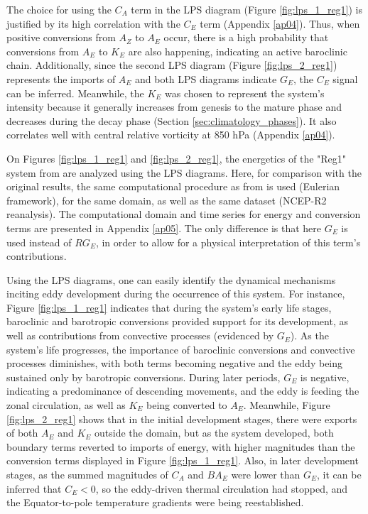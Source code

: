 The choice for using the $C_A$ term in the LPS diagram (Figure \ref{fig:lps_1_reg1}) is justified by its high correlation with the $C_E$ term (Appendix \ref{ap04}). Thus, when positive conversions from $A_Z$ to $A_E$ occur, there is a high probability that conversions from $A_E$ to $K_E$ are also happening, indicating an active baroclinic chain. Additionally, since the second LPS diagram (Figure \ref{fig:lps_2_reg1}) represents the imports of $A_E$ and both LPS diagrams indicate $G_E$, the $C_E$ signal can be inferred. Meanwhile, the $K_E$ was chosen to represent the system's intensity because it generally increases from genesis to the mature phase and decreases during the decay phase (Section \ref{sec:climatology_phases}). It also correlates well with central relative vorticity at 850 hPa (Appendix \ref{ap04}).

On Figures \ref{fig:lps_1_reg1} and \ref{fig:lps_2_reg1}, the energetics of the "Reg1" system from \citet{dias2011energy} are analyzed using the LPS diagrams. Here, for comparison with the original results, the same computational procedure as from \citet{dias2011energy} is used (Eulerian framework), for the same domain, as well as the same dataset (NCEP-R2 reanalysis). The computational domain and time series for energy and conversion terms are presented in Appendix \ref{ap05}. The only difference is that here $G_E$ is used instead of $RG_E$, in order to allow for a physical interpretation of this term's contributions.

Using the LPS diagrams, one can easily identify the dynamical mechanisms inciting eddy development during the occurrence of this system. For instance, Figure \ref{fig:lps_1_reg1} indicates that during the system's early life stages, baroclinic and barotropic conversions provided support for its development, as well as contributions from convective processes (evidenced by $G_E$). As the system's life progresses, the importance of baroclinic conversions and convective processes diminishes, with both terms becoming negative and the eddy being sustained only by barotropic conversions. During later periods, $G_E$ is negative, indicating a predominance of descending movements, and the eddy is feeding the zonal circulation, as well as $K_E$ being converted to $A_E$. Meanwhile, Figure \ref{fig:lps_2_reg1} shows that in the initial development stages, there were exports of both $A_E$ and $K_E$ outside the domain, but as the system developed, both boundary terms reverted to imports of energy, with higher magnitudes than the conversion terms displayed in Figure \ref{fig:lps_1_reg1}. Also, in later development stages, as the summed magnitudes of $C_A$ and $BA_E$ were lower than $G_E$, it can be inferred that $C_E < 0$, so the eddy-driven thermal circulation had stopped, and the Equator-to-pole temperature gradients were being reestablished.

